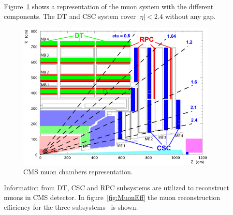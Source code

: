 Figure~\ref{fig:cmsmuon} shows a representation of the muon system with the different components. The DT and CSC system cover $|\eta|<2.4$ without any gap. 

\begin{figure}[!Hhtbp]
  \begin{center}
    \includegraphics[width=0.9\textwidth]{figs/MuonDetector.png}
    \caption{CMS muon chambers representation. }
    \label{fig:cmsmuon}
  \end{center}
\end{figure}

Information from DT, CSC and RPC subsystems are utilized to reconstruct muons in CMS detector. In figure~\ref{fig:MuonEff} the muon reconstruction efficiency for the three subsystems~\cite{Chatrchyan:2013sba} is shown.  

